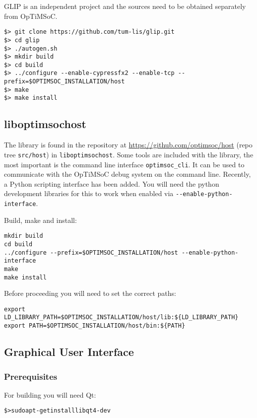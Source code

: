 GLIP is an independent project and the sources need to be obtained separately
from OpTiMSoC.

\begin{verbatim}
$> git clone https://github.com/tum-lis/glip.git
$> cd glip
$> ./autogen.sh
$> mkdir build
$> cd build
$> ../configure --enable-cypressfx2 --enable-tcp --prefix=$OPTIMSOC_INSTALLATION/host
$> make
$> make install
\end{verbatim}


\subsection{liboptimsochost}

The library is found in the repository at
\url{https://github.com/optimsoc/host} (repo tree \verb|src/host|) in
\verb|liboptimsochost|.  Some tools are included with the library, the
most important is the command line interface \verb|optimsoc_cli|. It
can be used to communicate with the OpTiMSoC debug system on the
command line. Recently, a Python scripting interface has been
added. You will need the python development libraries for this to work
when enabled via \verb|--enable-python-interface|.

Build, make and install:

\begin{verbatim}
mkdir build
cd build
../configure --prefix=$OPTIMSOC_INSTALLATION/host --enable-python-interface
make
make install
\end{verbatim}

Before proceeding you will need to set the correct paths:

\begin{verbatim}
export LD_LIBRARY_PATH=$OPTIMSOC_INSTALLATION/host/lib:${LD_LIBRARY_PATH}
export PATH=$OPTIMSOC_INSTALLATION/host/bin:${PATH}
\end{verbatim}

\subsection{Graphical User Interface}

\subsubsection{Prerequisites}

For building you will need Qt:

\begin{alltt}
\$> sudo apt-get install libqt4-dev
\end{alltt}

